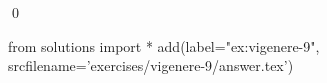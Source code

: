 
\begin{ex} 
  \label{ex:vigenere-9}
  
  \qed
\end{ex} 
\begin{python0}
from solutions import *
add(label="ex:vigenere-9",
    srcfilename='exercises/vigenere-9/answer.tex') 
\end{python0}

